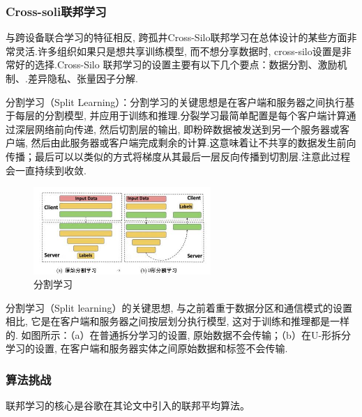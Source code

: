 \documentclass[a4paper]{article}
\begin{document}
\subsubsection{Cross-soli联邦学习} 
与跨设备联合学习的特征相反,  跨孤井Cross-Silo联邦学习在总体设计的某些方面非常灵活.许多组织如果只是想共享训练模型, 而不想分享数据时, cross-silo设置是非常好的选择.Cross-Silo 联邦学习的设置主要有以下几个要点：数据分割、激励机制、.差异隐私、张量因子分解.


分割学习（Split Learning）：分割学习的关键思想是在客户端和服务器之间执行基于每层的分割模型, 并应用于训练和推理.分裂学习最简单配置是每个客户端计算通过深层网络前向传递, 然后切割层的输出, 即粉碎数据被发送到另一个服务器或客户端, 然后由此服务器或客户端完成剩余的计算.这意味着让不共享的数据发生前向传播；最后可以以类似的方式将梯度从其最后一层反向传播到切割层.注意此过程会一直持续到收敛.
\begin{figure}[ht]
    \centering    
    \includegraphics[width=0.6\textwidth]{split_learning.jpg}
    \caption{分割学习}
\end{figure}


分割学习（Split learning）的关键思想, 与之前着重于数据分区和通信模式的设置相比, 它是在客户端和服务器之间按层划分执行模型, 这对于训练和推理都是一样的.
如图所示：（a）在普通拆分学习的设置, 原始数据不会传输；（b）在U-形拆分学习的设置, 在客户端和服务器实体之间原始数据和标签不会传输.



\subsubsection{算法挑战}



联邦学习的核心是谷歌在其论文\cite{mcmahan2016communication}中引入的联邦平均算法\cite{alg:fedavg}。
 
\end{document}
